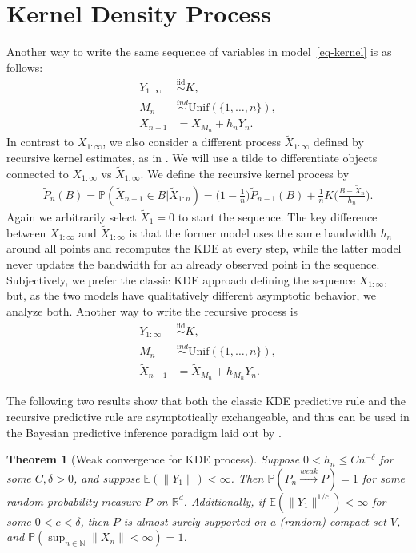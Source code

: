 \documentclass[12pt]{article}
\newtheorem{theorem}{Theorem}
\newcommand{\R}{\mathbb{R}}
\newcommand{\N}{\mathbb{N}}
\newcommand{\E}{\mathbb{E}}
\newcommand{\bP}{\mathbb{P}}
\newcommand{\iid}{\overset{\mathrm{iid}}{\sim}}
\begin{document}
\section{Kernel Density Process}\label{sec-main}

Another way to write the same sequence of variables in model~\ref{eq-kernel} is as follows:
\begin{align*}
    Y_{1:\infty} &\iid K,\\
    M_n &\overset{ind}{\sim} \text{Unif}(\{1, \ldots, n\}), \\
    X_{n + 1} &= X_{M_n} + h_n Y_n.
\end{align*}
In contrast to $X_{1:\infty}$, we also consider a different process $\tilde{X}_{1:\infty}$ defined by recursive kernel estimates, as in \citet{wolverton1969asymptotically, battiston2025bayesian}. We will use a tilde to differentiate objects connected to $X_{1:\infty}$ vs $\tilde{X}_{1:\infty}$. We define the recursive kernel process by
\begin{align}\label{eq-recursive}
    \tilde{P}_n(B) = \bP(\tilde{X}_{n + 1} \in B | \tilde{X}_{1:n}) = \bigg(1 - \frac{1}{n}\bigg)\tilde{P}_{n - 1}(B) + \frac{1}{n} K\bigg(\frac{B - \tilde{X}_n}{h_n}\bigg).
\end{align}
Again we arbitrarily select $\tilde{X}_1 = 0$ to start the sequence. The key difference between $X_{1:\infty}$ and $\tilde{X}_{1:\infty}$ is that the former model uses the same bandwidth $h_n$ around all points and recomputes the KDE at every step, while the latter model never updates the bandwidth for an already observed point in the sequence. Subjectively, we prefer the classic KDE approach defining the sequence $X_{1:\infty}$, but, as the two models have qualitatively different asymptotic behavior, we analyze both. Another way to write the recursive process is
\begin{align*}
    Y_{1:\infty} &\iid K,\\
    M_n &\overset{ind}{\sim} \text{Unif}(\{1, \ldots, n\}), \\
    \tilde{X}_{n + 1} &= \tilde{X}_{M_n} + h_{M_n} Y_n.
\end{align*}

The following two results show that both the classic KDE predictive rule and the recursive predictive rule are asymptotically exchangeable, and thus can be used in the Bayesian predictive inference paradigm laid out by \citet{fortini2025exchangeability}.

\begin{theorem}[Weak convergence for KDE process]\label{thm-kde-conv}
    Suppose $0 < h_n \leq Cn^{-\delta}$ for some $C, \delta > 0$, and suppose $\E(\|Y_1\|) < \infty$. Then $\bP(P_n \overset{weak}{\to} P) = 1$ for some random probability measure $P$ on $\R^d$. Additionally, if $\E(\|Y_1\|^{1/c}) < \infty$ for some $0 < c < \delta$, then $P$ is almost surely supported on a (random) compact set $V$, and $\bP(\sup_{n \in \N} \|X_n\| < \infty) = 1$.
\end{theorem}
\end{document}
